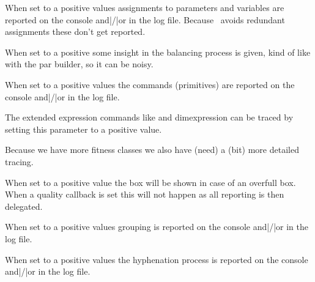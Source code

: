 \stopnewprimitive

\startoldprimitive[title={\prm {tracingassigns}}]

When set to a positive values assignments to parameters and variables are
reported on the console and|/|or in the log file. Because \LUAMETATEX\ avoids
redundant assignments these don't get reported.

\stopoldprimitive

\startnewprimitive[title={\prm {tracingbalancing}}]

When set to a positive some insight in the balancing process is given, kind of
like with the par builder, so it can be noisy.

\stopnewprimitive

\startoldprimitive[title={\prm {tracingcommands}}]

When set to a positive values the commands (primitives) are reported on the console
and|/|or in the log file.

\stopoldprimitive

\startnewprimitive[title={\prm {tracingexpressions}}]

The extended expression commands like  and \prm
{dimexpression} can be traced by setting this parameter to a positive value.

\stopnewprimitive

\startnewprimitive[title={\prm {tracingfitness}}]

Because we have more fitness classes we also have (need) a (bit) more detailed
tracing.

\stopnewprimitive

\startnewprimitive[title={\prm {tracingfullboxes}}]

When set to a positive value the box will be shown in case of an overfull box.
When a quality callback is set this will not happen as all reporting is then
delegated.

\stopnewprimitive

\startoldprimitive[title={\prm {tracinggroups}}]

When set to a positive values grouping is reported on the console and|/|or in the
log file.

\stopoldprimitive

\startnewprimitive[title={\prm {tracinghyphenation}}]

When set to a positive values the hyphenation process is reported on the console
and|/|or in the log file.

\stopnewprimitive

